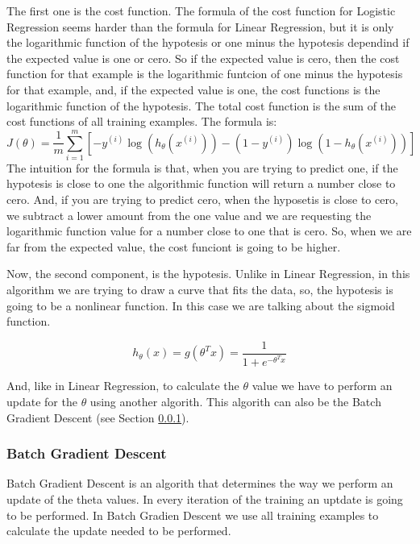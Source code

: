 \documentclass[12pt]{article}
\begin{document}
The first one is the cost function. The formula of the cost function for Logistic Regression seems harder than the formula for Linear Regression, but it is only the logarithmic function of the hypotesis or one minus the hypotesis dependind if the expected value is one or cero. So if the expected value is cero, then the cost function for that example is the logarithmic funtcion of one minus the hypotesis for that example, and, if the expected value is one, the cost functions is the logarithmic function of the hypotesis. The total cost function is the sum of the cost functions of all training examples. The formula is:
\begin{equation}
  J(\theta)=\frac{1}{m} \displaystyle\sum_{i=1}^{m} [-y^{(i)}\log(h_{\theta}(x^{(i)}))-(1-y^{(i)})\log(1 -h_{\theta}(x^{(i)}))]
\end{equation}
 The intuition for the formula is that, when you are trying to predict one, if the hypotesis is close to one the algorithmic function will return a number close to cero. And, if you are trying to predict cero, when the hyposetis is close to cero, we subtract a lower amount from the one value and we are requesting the logarithmic function value for a number close to one that is cero. So, when we are far from the expected value, the cost funciont is going to be higher.
 
 Now, the second component, is the hypotesis. Unlike in Linear Regression, in this algorithm we are trying to draw a curve that fits the data, so, the hypotesis is going to be a nonlinear function. In this case we are talking about the sigmoid function.
 
 \begin{equation}
  h_{\theta}(x)=g(\theta^Tx)=\frac{1}{1+e^{-\theta^Tx}}
\end{equation}

 And, like in Linear Regression, to calculate the $\theta$ value we have to perform an update for the $\theta$ using another algorith. This algorith can also be the Batch Gradient Descent (see Section \ref{sec:Gradient}).
\subsubsection{Batch Gradient Descent}
\label{sec:Gradient}
Batch Gradient Descent is an algorith that determines the way we perform an update of the theta values. In every iteration of the training an uptdate is going to be performed. In Batch Gradien Descent we use all training examples to calculate the update needed to be performed. 
\end{document}

